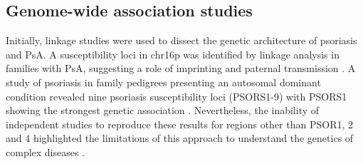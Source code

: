 





\subsection{Genome-wide association studies}

Initially, linkage studies were used to dissect the genetic architecture of psoriasis and PsA. A susceptibility loci in chr16p was identified by linkage analysis in families with PsA, suggesting a role of imprinting and paternal transmission \parencite{Karason2003}. A study of psoriasis in family pedigrees presenting an autosomal dominant condition revealed nine psoriasis susceptibility loci (PSORS1-9) with PSORS1 showing the strongest genetic association \parencite{Consortium2003}. Nevertheless, the inability of independent studies to reproduce these results for regions other than PSOR1, 2 and 4 highlighted the limitations of this approach to understand the genetics of complex diseases \parencite{Capon2017}.

